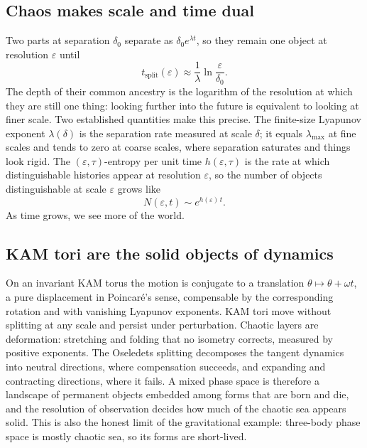 \documentclass[11pt]{article}
\theoremstyle{remark}
\begin{document}
\subsection{Chaos makes scale and time dual}

Two parts at separation $\delta_0$ separate as $\delta_0e^{\lambda t}$, so they remain one object at resolution
$\varepsilon$ until
\begin{equation}
  t_{\text{split}}(\varepsilon)\approx\frac1\lambda\ln\frac{\varepsilon}{\delta_0}.
  \label{eq:split}
\end{equation}
The depth of their common ancestry is the logarithm of the resolution at which they are still one thing:
looking further into the future is equivalent to looking at finer scale. Two established quantities make this
precise. The finite-size Lyapunov exponent $\lambda(\delta)$ \cite{Aurell1997} is the separation rate measured at
scale $\delta$; it equals $\lambda_{\max}$ at fine scales and tends to zero at coarse scales, where separation
saturates and things look rigid. The $(\varepsilon,\tau)$-entropy per unit time $h(\varepsilon,\tau)$
\cite{GaspardWang1993} is the rate at which distinguishable histories appear at resolution $\varepsilon$, so
the number of objects distinguishable at scale $\varepsilon$ grows like
\begin{equation}
  N(\varepsilon,t)\sim e^{h(\varepsilon)\,t}.
\end{equation}
As time grows, we see more of the world.

\subsection{KAM tori are the solid objects of dynamics}

On an invariant KAM torus \cite{Kolmogorov1954,Arnold1963,Moser1962} the motion is conjugate to a translation
$\theta\mapsto\theta+\omega t$, a pure displacement in Poincar\'e's sense, compensable by the corresponding
rotation and with vanishing Lyapunov exponents. KAM tori move without splitting at any scale and persist under
perturbation. Chaotic layers are deformation: stretching and folding that no isometry corrects, measured by
positive exponents. The Oseledets splitting decomposes the tangent dynamics into neutral directions, where
compensation succeeds, and expanding and contracting directions, where it fails. A mixed phase space is
therefore a landscape of permanent objects embedded among forms that are born and die, and the resolution of
observation decides how much of the chaotic sea appears solid. This is also the honest limit of the
gravitational example: three-body phase space is mostly chaotic sea, so its forms are short-lived.
\end{document}
